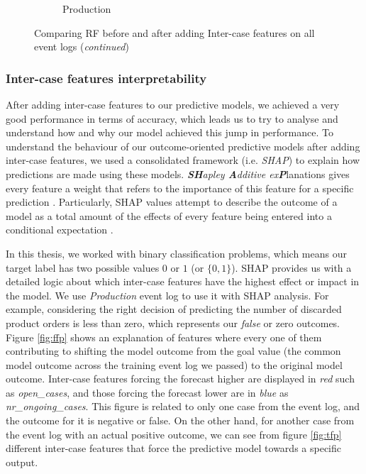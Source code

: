 \begin{figure}[!htbp]
\begin{subfigure}{0.48\textwidth}
		\caption{Production} \label{fig:proi}
	\end{subfigure}\hspace*{\fill}
	\caption{Comparing RF before and after adding Inter-case features on all event logs (\textit{continued})}
\label{fig:interr3}
\end{figure}


\clearpage
\subsubsection{Inter-case features interpretability}

After adding inter-case features to our predictive models, we achieved a very good performance in terms of accuracy, which leads us to try to analyse and understand how and why our model achieved this jump in performance. To understand the behaviour of our outcome-oriented predictive models after adding inter-case features, we used a consolidated framework (i.e. \textit{SHAP}) to explain how predictions are made using these models. \textit{\textbf{SH}apley \textbf{A}dditive ex\textbf{P}}lanations gives every feature a weight that refers to the importance of this feature for a specific prediction \cite{lundberg2017unified}. Particularly, SHAP values attempt to describe the outcome of a model as a total amount of the effects of every feature being entered into a conditional expectation \cite{lundberg2018consistent}.


In this thesis, we worked with binary classification problems, which means our target label has two possible values $0$ or $1$ (or $\{0,1\}$). SHAP  provides us with a detailed logic about which inter-case features have the highest effect or impact in the model. We use \textit{Production} event log to use it with SHAP analysis. For example, considering the right decision of predicting the number of discarded product orders is less than zero, which represents our \textit{false} or zero outcomes.  Figure \ref{fig:ffp} shows an explanation of features where every one of them contributing to shifting the model outcome from the goal value  (the common model outcome across the training event log we passed) to the original model outcome. Inter-case features forcing the forecast higher are displayed in \textit{red} such as \textit{open\_cases}, and those forcing the forecast lower are in \textit{blue} as \textit{nr\_ongoing\_cases}. This figure is related to only one case from the event log, and the outcome for it is negative or false. On the other hand, for another case from the event log with an actual positive outcome, we can see from figure \ref{fig:tfp} different inter-case features that force the predictive model towards a specific output. 

